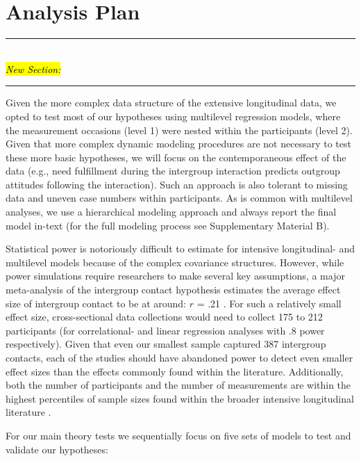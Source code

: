 \documentclass[man, 12pt, a4paper, mask]{apa7}
\theoremstyle{break}
\theoremstyle{plain}
\begin{document}
\section{Analysis Plan}
\begin{center}
    \noindent\rule{8cm}{0.4pt}\\
    \hl{\textit{New Section:}}\\
    \vspace{-0.25cm}
    \noindent\rule{8cm}{0.4pt}
\end{center}

Given the more complex data structure of the extensive longitudinal data, we opted to test most of our hypotheses using multilevel regression models, where the measurement occasions (level 1) were nested within the participants (level 2). Given that more complex dynamic modeling procedures are not necessary to test these more basic hypotheses, we will focus on the contemporaneous effect of the data (e.g., need fulfillment during the intergroup interaction predicts outgroup attitudes following the interaction). Such an approach is also tolerant to missing data and uneven case numbers within participants. As is common with multilevel analyses, we use a hierarchical modeling approach and always report the final model in-text (for the full modeling process see Supplementary Material B).

Statistical power is notoriously difficult to estimate for intensive longitudinal- and multilevel models because of the complex covariance structures. However, while power simulations require researchers to make several key assumptions, a major meta-analysis of the intergroup contact hypothesis estimates the average effect size of intergroup contact to be at around: $r$ = .21 \citep[][]{Pettigrew2006}. For such a relatively small effect size, cross-sectional data collections would need to collect 175 to 212 participants (for correlational- and linear regression analyses with .8 power respectively). Given that even our smallest sample captured 387 intergroup contacts, each of the studies should have abandoned power to detect even smaller effect sizes than the effects commonly found within the literature. Additionally, both the number of participants and the number of measurements are within the highest percentiles of sample sizes found within the broader intensive longitudinal literature \citep[e.g.,][]{AanhetRot2012}.

For our main theory tests we sequentially focus on five sets of models to test and validate our hypotheses:
\end{document}
